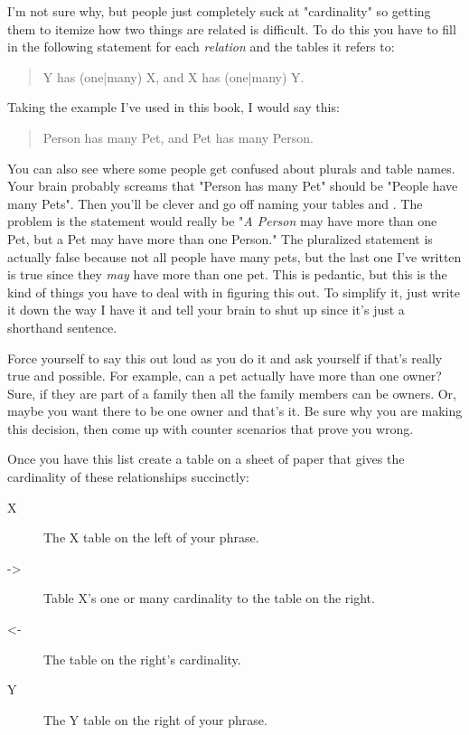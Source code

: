 I'm not sure why, but people just completely suck at "cardinality" so getting
them to itemize how two things are related is difficult.  To do this you have
to fill in the following statement for each \emph{relation} and the tables it
refers to:

\begin{quote}
    Y has (one|many) X, and X has (one|many) Y.
\end{quote}

Taking the example I've used in this book, I would say this:

\begin{quote}
    Person has many Pet, and Pet has many Person.
\end{quote}

You can also see where some people get confused about plurals and table names.
Your brain probably screams that "Person has many Pet" should be "People have
many Pets".  Then you'll be clever and go off naming your tables 
and .  The problem is the statement would really be "\emph{A
Person} may have more than one Pet, but a Pet may have more than one Person."
The pluralized statement is actually false because not all people have many
pets, but the last one I've written is true since they \emph{may} have more
than one pet.  This is pedantic, but this is the kind of things you have to
deal with in figuring this out.  To simplify it, just write it down the way I
have it and tell your brain to shut up since it's just a shorthand sentence.

Force yourself to say this out loud as you do it and ask yourself if that's
really true and possible.  For example, can a pet actually have more than
one owner?  Sure, if they are part of a family then all the family members
can be owners.  Or, maybe you want there to be one owner and that's it.  Be sure
why you are making this decision, then come up with counter scenarios that prove
you wrong.

Once you have this list create a table on a sheet of paper that gives the cardinality
of these relationships succinctly:

\begin{description}
\item[X] The X table on the left of your phrase.
\item[->] Table X's one or many cardinality to the table on the right.
\item[<-] The table on the right's cardinality.
\item[Y] The Y table on the right of your phrase.
\end{description}


